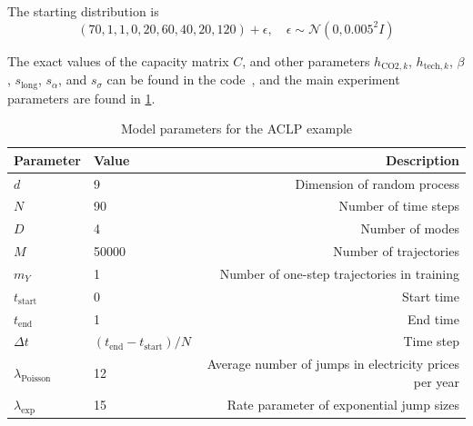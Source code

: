 \documentclass[11pt,reqno,a4paper]{amsart}
\theoremstyle{definition}
\numberwithin{equation}{section}
\DeclareMathOperator{\1}{\mathbbm{1}}
\begin{document}
The starting distribution is
\begin{equation}\label{eq:aid:x0}
  (70,1,1,0,20,60,40,20,120) + \epsilon, \quad \epsilon \sim \mathcal{N}(0,0.005^2I)
\end{equation}


The exact values of the capacity matrix $C$, and other parameters $h_{\text{CO2},k}$, $h_{\text{tech},k}$, $\beta$, $s_\text{long}$, $s_\alpha$, and $s_\sigma$ can be found in the code~\cite{code}, and the main experiment parameters are found in \cref{tab:aid_params}.
\begin{table}[ht]
  \centering
  \caption{Model parameters for the ACLP example}
  \label{tab:aid_params}
  \begin{tabular}{@{}llr@{}}
    \toprule
    Parameter                & Value                               & Description                                            \\
    \midrule
    $d$                      & 9                                   & Dimension of random process                            \\
    $N$                      & 90                                  & Number of time steps                                   \\
    $D$                      & 4                                   & Number of modes                                        \\
    $M$                      & 50000                               & Number of trajectories                                 \\
    $m_Y$                    & 1                                   & Number of one-step trajectories in training            \\
    $t_\text{start}$         & 0                                   & Start time                                             \\
    $t_\text{end}$           & 1                                   & End time                                               \\
    $\Delta t$               & $(t_\text{end} - t_\text{start})/N$ & Time step                                              \\
    $\lambda_\text{Poisson}$ & 12                                  & Average number of jumps in electricity prices per year \\
    $\lambda_\text{exp}$     & 15                                  & Rate parameter of exponential jump sizes               \\
    \bottomrule
  \end{tabular}
\end{table}
\end{document}
